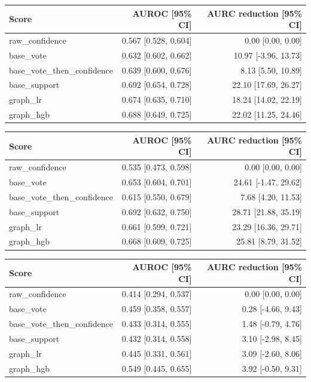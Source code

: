 \begin{tabular}{lrr}
\hline
Score & AUROC [95\% CI] & AURC reduction [95\% CI] \\
\hline
raw\_confidence & 0.567 [0.528, 0.604] & 0.00 [0.00, 0.00] \\
base\_vote & 0.632 [0.602, 0.662] & 10.97 [-3.96, 13.73] \\
base\_vote\_then\_confidence & 0.639 [0.600, 0.676] & 8.13 [5.50, 10.89] \\
base\_support & 0.692 [0.654, 0.728] & 22.10 [17.69, 26.27] \\
graph\_lr & 0.674 [0.635, 0.710] & 18.24 [14.02, 22.19] \\
graph\_hgb & 0.688 [0.649, 0.725] & 22.02 [11.25, 24.46] \\
\hline
\end{tabular}

\begin{tabular}{lrr}
\hline
Score & AUROC [95\% CI] & AURC reduction [95\% CI] \\
\hline
raw\_confidence & 0.535 [0.473, 0.598] & 0.00 [0.00, 0.00] \\
base\_vote & 0.653 [0.604, 0.701] & 24.61 [-1.47, 29.62] \\
base\_vote\_then\_confidence & 0.615 [0.550, 0.679] & 7.68 [4.20, 11.53] \\
base\_support & 0.692 [0.632, 0.750] & 28.71 [21.88, 35.19] \\
graph\_lr & 0.661 [0.599, 0.721] & 23.29 [16.36, 29.71] \\
graph\_hgb & 0.668 [0.609, 0.725] & 25.81 [8.79, 31.52] \\
\hline
\end{tabular}

\begin{tabular}{lrr}
\hline
Score & AUROC [95\% CI] & AURC reduction [95\% CI] \\
\hline
raw\_confidence & 0.414 [0.294, 0.537] & 0.00 [0.00, 0.00] \\
base\_vote & 0.459 [0.358, 0.557] & 0.28 [-4.66, 9.43] \\
base\_vote\_then\_confidence & 0.433 [0.314, 0.555] & 1.48 [-0.79, 4.76] \\
base\_support & 0.432 [0.314, 0.558] & 3.10 [-2.98, 8.45] \\
graph\_lr & 0.445 [0.331, 0.561] & 3.09 [-2.60, 8.06] \\
graph\_hgb & 0.549 [0.445, 0.655] & 3.92 [-0.50, 9.31] \\
\hline
\end{tabular}

